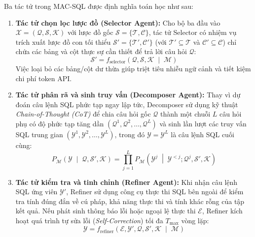 \documentclass[12pt,a4paper]{report}
\begin{document}
Ba tác tử trong MAC-SQL được định nghĩa toán học như sau:
\begin{enumerate}
    \item \textbf{Tác tử chọn lọc lược đồ (Selector Agent):} Cho bộ ba đầu vào $\mathcal{X} = (\mathcal{Q}, \mathcal{S}, \mathcal{K})$ với lược đồ gốc $\mathcal{S} = \{\mathcal{T}, \mathcal{C}\}$, tác tử Selector có nhiệm vụ trích xuất lược đồ con tối thiểu $\mathcal{S}' = \{\mathcal{T}', \mathcal{C}'\}$ (với $\mathcal{T}' \subseteq \mathcal{T}$ và $\mathcal{C}' \subseteq \mathcal{C}$) chỉ chứa các bảng và cột thực sự cần thiết để trả lời câu hỏi $\mathcal{Q}$:
    \begin{equation}
        \mathcal{S}' = f_{\text{selector}}\left(\mathcal{Q}, \mathcal{S}, \mathcal{K} \;\middle|\; \mathcal{M}\right)
        \label{eq:macsql_selector}
    \end{equation}
    Việc loại bỏ các bảng/cột dư thừa giúp triệt tiêu nhiễu ngữ cảnh và tiết kiệm chi phí token API.
    \item \textbf{Tác tử phân rã và sinh truy vấn (Decomposer Agent):} Thay vì dự đoán câu lệnh SQL phức tạp ngay lập tức, Decomposer sử dụng kỹ thuật \textit{Chain-of-Thought (CoT)} để chia câu hỏi gốc $\mathcal{Q}$ thành một chuỗi $L$ câu hỏi phụ có độ phức tạp tăng dần $(\mathcal{Q}^1, \mathcal{Q}^2, \dots, \mathcal{Q}^L)$ và sinh lần lượt các truy vấn SQL trung gian $(\mathcal{Y}^1, \mathcal{Y}^2, \dots, \mathcal{Y}^L)$, trong đó $\mathcal{Y} = \mathcal{Y}^L$ là câu lệnh SQL cuối cùng:
    \begin{equation}
        P_{\mathcal{M}}\left(\mathcal{Y} \;\middle|\; \mathcal{Q}, \mathcal{S}', \mathcal{K}\right) = \prod_{j=1}^{L} P_{\mathcal{M}}\left( \mathcal{Y}^j \;\middle|\; \mathcal{Y}^{<j}; \mathcal{Q}^j, \mathcal{S}', \mathcal{K} \right)
        \label{eq:macsql_decomposer}
    \end{equation}
    \item \textbf{Tác tử kiểm tra và tinh chỉnh (Refiner Agent):} Khi nhận câu lệnh SQL ứng viên $\mathcal{Y}'$, Refiner sử dụng công cụ thực thi SQL bên ngoài để kiểm tra tính đúng đắn về cú pháp, khả năng thực thi và tính khác rỗng của tập kết quả. Nếu phát sinh thông báo lỗi hoặc ngoại lệ thực thi $\mathcal{E}$, Refiner kích hoạt quá trình tự sửa lỗi (\textit{Self-Correction}) tối đa $T_{\max}$ vòng lặp:
    \begin{equation}
        \mathcal{Y} = f_{\text{refiner}}\left(\mathcal{E}, \mathcal{Y}', \mathcal{Q}, \mathcal{S}', \mathcal{K} \;\middle|\; \mathcal{M}\right)
        \label{eq:macsql_refiner}
    \end{equation}
\end{enumerate}
\end{document}
